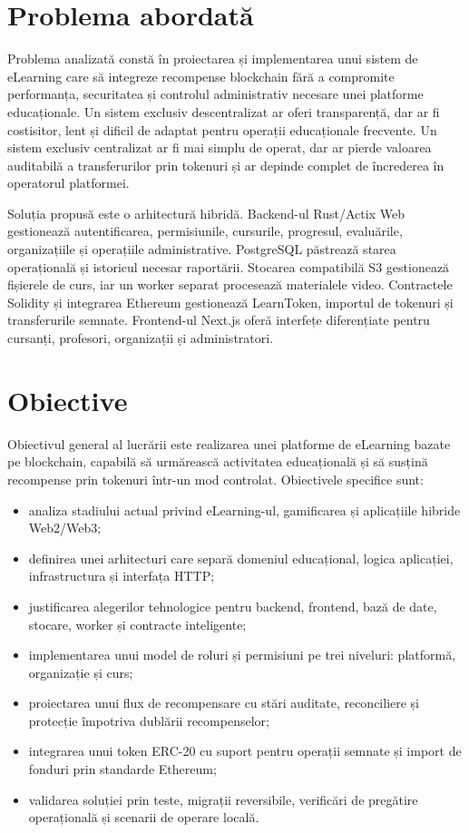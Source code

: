 \section{Problema abordată}
Problema analizată constă în proiectarea și implementarea unui sistem de eLearning care să integreze recompense blockchain fără a compromite performanța, securitatea și controlul administrativ necesare unei platforme educaționale. Un sistem exclusiv descentralizat ar oferi transparență, dar ar fi costisitor, lent și dificil de adaptat pentru operații educaționale frecvente. Un sistem exclusiv centralizat ar fi mai simplu de operat, dar ar pierde valoarea auditabilă a transferurilor prin tokenuri și ar depinde complet de încrederea în operatorul platformei.

Soluția propusă este o arhitectură hibridă. Backend-ul Rust/Actix Web gestionează autentificarea, permisiunile, cursurile, progresul, evaluările, organizațiile și operațiile administrative. PostgreSQL păstrează starea operațională și istoricul necesar raportării. Stocarea compatibilă S3 gestionează fișierele de curs, iar un worker separat procesează materialele video. Contractele Solidity și integrarea Ethereum gestionează LearnToken, importul de tokenuri și transferurile semnate. Frontend-ul Next.js oferă interfețe diferențiate pentru cursanți, profesori, organizații și administratori.

\section{Obiective}
Obiectivul general al lucrării este realizarea unei platforme de eLearning bazate pe blockchain, capabilă să urmărească activitatea educațională și să susțină recompense prin tokenuri într-un mod controlat. Obiectivele specifice sunt:

\begin{itemize}[leftmargin=1.4cm]
    \item analiza stadiului actual privind eLearning-ul, gamificarea și aplicațiile hibride Web2/Web3;
    \item definirea unei arhitecturi care separă domeniul educațional, logica aplicației, infrastructura și interfața HTTP;
    \item justificarea alegerilor tehnologice pentru backend, frontend, bază de date, stocare, worker și contracte inteligente;
    \item implementarea unui model de roluri și permisiuni pe trei niveluri: platformă, organizație și curs;
    \item proiectarea unui flux de recompensare cu stări auditate, reconciliere și protecție împotriva dublării recompenselor;
    \item integrarea unui token ERC-20 cu suport pentru operații semnate și import de fonduri prin standarde Ethereum;
    \item validarea soluției prin teste, migrații reversibile, verificări de pregătire operațională și scenarii de operare locală.
\end{itemize}

